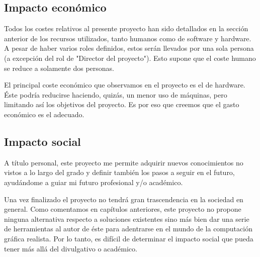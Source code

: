 \documentclass[titlepage,10.5pt]{report}
\begin{document}
\subsection{Impacto económico}

Todos los costes relativos al presente proyecto han sido detallados en la sección anterior de los recursos utilizados, tanto humanos como de software y hardware. A pesar de haber varios roles definidos, estos serán llevados por una sola persona (a excepción del rol de "Director del proyecto"). Esto supone que el coste humano se reduce a solamente dos personas. 

El principal coste económico que observamos en el proyecto es el de hardware. Éste podría reducirse haciendo, quizás, un menor uso de máquinas, pero limitando así los objetivos del proyecto. Es por eso que creemos que el gasto económico es el adecuado.

\subsection{Impacto social}

A título personal, este proyecto me permite adquirir nuevos conocimientos no vistos a lo largo del grado y definir también los pasos a seguir en el futuro, ayudándome a guiar mi futuro profesional y/o académico.

Una vez finalizado el proyecto no tendrá gran trascendencia en la sociedad en general. Como comentamos en capítulos anteriores, este proyecto no propone ninguna alternativa respecto a soluciones existentes sino más bien dar una serie de herramientas al autor de éste para adentrarse en el mundo de la computación gráfica realista. Por lo tanto, es difícil de determinar el impacto social que pueda tener más allá del divulgativo o académico.
\end{document}
